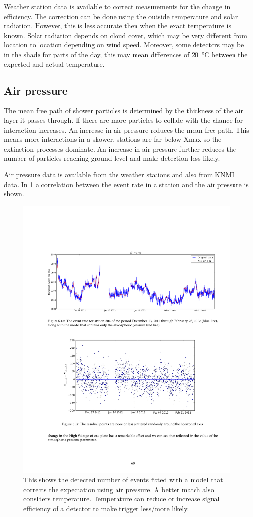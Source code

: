 Weather station data is available to correct measurements for the change in efficiency. The correction can be done using the outside temperature and solar radiation. However, this is less accurate then when the exact \pmt temperature is known. Solar radiation depends on cloud cover, which may be very different from location to location depending on wind speed. Moreover, some detectors may be in the shade for parts of the day, this may mean differences of \SI{20}{\degreeCelsius} between the expected and actual temperature.


\subsection{Air pressure}

The mean free path of shower particles is determined by the thickness of the air layer it passes through. If there are more particles to collide with the chance for interaction increases. An increase in air pressure reduces the mean free path. This means more interactions in a shower. \hisparc stations are far below Xmax so the extinction processes dominate. An increase in air pressure further reduces the number of particles reaching ground level and make detection less likely.

Air pressure data is available from the \hisparc weather stations and also from KNMI data. In \cref{fig:rate_pressures} a correlation between the event rate in a station and the air pressure is shown.

\begin{figure}
    \centering
    \includegraphics[width=.7\linewidth]{plots/station/barometer}
    \caption{This shows the detected number of events fitted with a model that corrects the expectation using air pressure. A better match also considers temperature. Temperature can reduce or increase signal efficiency of a detector to make trigger less/more likely.}
    \label{fig:rate_pressures}
\end{figure}

